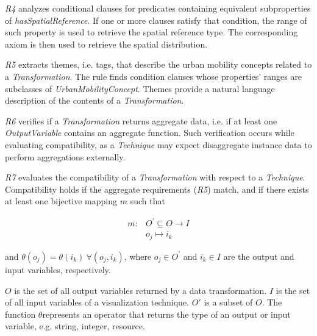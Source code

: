 \documentclass[]{interact}
\theoremstyle{plain}%
\theoremstyle{definition}
\theoremstyle{remark}
\theoremstyle{definition}
\begin{document}
\textit{R4} analyzes conditional clauses for predicates containing  equivalent subproperties of \textit{hasSpatialReference}. If one or more clauses satisfy that condition, the range of such property is used to retrieve the spatial reference type. The corresponding axiom is then used to retrieve the spatial distribution. %

\textit{R5} extracts themes, i.e. tags, that describe the urban mobility concepts related to a \textit{Transformation}. The rule finds condition clauses whose properties' ranges are subclasses of \textit{UrbanMobilityConcept}. Themes provide a natural language description of the contents of a \textit{Transformation}.

\textit{R6} verifies if a \textit{Transformation} returns aggregate data, i.e. if at least one \textit{OutputVariable} contains an aggregate function. Such verification occurs while evaluating compatibility, as a \textit{Technique} may expect disaggregate instance data to perform aggregations externally.


\textit{R7} evaluates the compatibility of a \textit{Transformation} with respect to a \textit{Technique}. Compatibility holds if the aggregate requirements (\textit{R5}) match, and if there exists at least one bijective mapping $m$ such that

\begin{align*}
    m \colon & O^{\prime} \subseteq O \rightarrow I \\
    & o_j \longmapsto i_k
\end{align*}

and $\theta(o_j) = \theta(i_k) \ \forall (o_j,i_k)$, where $o_j \in O^{ \prime}$ and $i_k \in I$ are the output and input variables, respectively.

$O$ is the set of all output variables returned by a data transformation. $I$ is the set of all input variables of a visualization technique. $O'$ is a subset of $O$.
The function $\theta$represents an operator that returns the type of an output or input variable, e.g. string, integer, resource.


\end{document}
